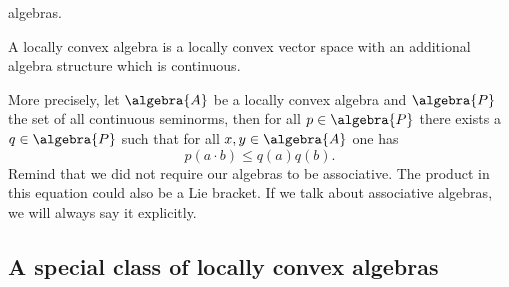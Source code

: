 algebras.
\begin{definition}
	\label{Def:LCAlgebra}
	A locally convex algebra is a locally convex vector space with an 
	additional algebra structure which is continuous.
\end{definition}
More precisely, let $\algebra{A}$ be a locally convex algebra and 
$\algebra{P}$ the set of all continuous seminorms, then for all $p \in 
\algebra{P}$ there exists a $q \in \algebra{P}$ such that for all $x, y \in 
\algebra{A}$ one has
\begin{equation}
	\label{LCAna:ProductContinuity}
	p(a \cdot b)
	\leq
	q(a) q(b).
\end{equation}
Remind that we did not require our algebras to be associative. The product in 
this equation could also be a Lie bracket. If we talk about associative 
algebras, we will always say it explicitly.



\subsection{A special class of locally convex algebras}

